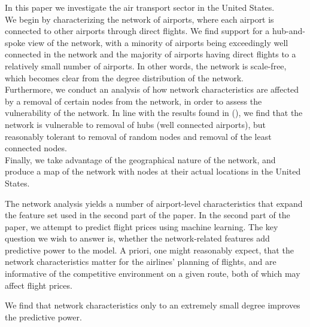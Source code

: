 \label{sec:intro}





In this paper we investigate the air transport sector in the United States.\\ We begin by characterizing the network of airports, where each airport is connected to other airports through direct flights. We find support for a hub-and-spoke view of the network, with a minority of airports being exceedingly well connected in the network and the majority of airports having direct flights to a relatively small number of airports. In other words, the network is scale-free, which becomes clear from the degree distribution of the network. \\ Furthermore, we conduct an analysis of how network characteristics are affected by a removal of certain nodes from the network, in order to assess the vulnerability of the network. In line with the results found in (\cite{chi2004structural}), we find that the network is vulnerable to removal of hubs (well connected airports), but reasonably tolerant to removal of random nodes and removal of the least connected nodes. \\ Finally, we take advantage of the geographical nature of the network, and produce a map of the network with nodes at their actual locations in the United States. 

The network analysis yields a number of airport-level characteristics that expand the feature set used in the second part of the paper. In the second part of the paper, we attempt to predict flight prices using machine learning. The key question we wish to answer is, whether the network-related features add predictive power to the model. A priori, one might reasonably expect, that the network characteristics matter for the airlines' planning of flights, and are informative of the competitive environment on a given route, both of which may affect flight prices. 

We find that network characteristics only to an extremely small degree improves the predictive power.
